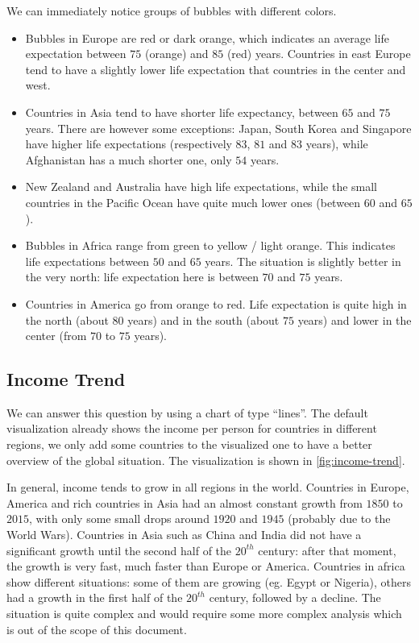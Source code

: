 We can immediately notice groups of bubbles with different colors.
\begin{itemize}
	\item Bubbles in Europe are red or dark orange, which indicates an average life expectation between $75$ (orange) and $85$ (red) years.	Countries in east Europe tend to have a slightly lower life expectation that countries in the center and west.
	\item Countries in Asia tend to have shorter life expectancy, between $65$ and $75$ years. There are however some exceptions: Japan, South Korea and Singapore have higher life expectations (respectively $83$, $81$ and $83$ years), while Afghanistan has a much shorter one, only $54$ years.
	\item New Zealand and Australia have high life expectations, while the small countries in the Pacific Ocean have quite much lower ones (between $60$ and $65$).
	\item Bubbles in Africa range from green to yellow / light orange. This indicates life expectations between $50$ and $65$ years. The situation is slightly better in the very north: life expectation here is between $70$ and $75$ years.
	\item Countries in America go from orange to red. Life expectation is quite high in the north (about $80$ years) and in the south (about $75$ years) and lower in the center (from $70$ to $75$ years).
\end{itemize}


\subsection{Income Trend}
We can answer this question by using a chart of type ``lines''.
The default visualization already shows the income per person for countries in different regions,
we only add some countries to the visualized one to have a better overview of the global situation.
The visualization is shown in \cref{fig:income-trend}.

In general, income tends to grow in all regions in the world.
Countries in Europe, America and rich countries in Asia had an almost constant growth from $1850$ to $2015$, with only some small drops around $1920$ and $1945$ (probably due to the World Wars).
Countries in Asia such as China and India did not have a significant growth until the second half of the $20^{th}$ century:
after that moment, the growth is very fast, much faster than Europe or America.
Countries in africa show different situations:
some of them are growing (eg. Egypt or Nigeria), others had a growth in the first half of the $20^{th}$ century, followed by a decline.
The situation is quite complex and would require some more complex analysis which is out of the scope of this document.

